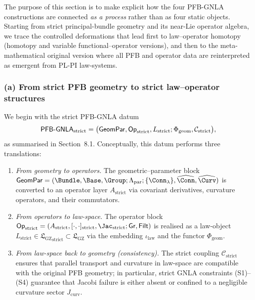 \documentclass[11pt]{book}
\theoremstyle{plain}
\theoremstyle{definition}
\newcommand{\GZLS}{\ensuremath{\mathfrak{L}_{\mathrm{GZ}}}}       \newcommand{\GZLT}{\ensuremath{M_{!w}}}                           \newcommand{\GZLOC}{\ensuremath{A_M}}                             \newcommand{\GZLCurv}{\ensuremath{\mathcal{F}_{\mathrm{law}}}}
\begin{document}
The purpose of this section is to make explicit how the four PFB-GNLA
constructions are connected \emph{as a process} rather than as four
static objects. Starting from strict principal-bundle geometry and its
near-Lie operator algebra, we trace the controlled deformations that
lead first to law--operator homotopy (homotopy and variable
functional--operator versions), and then to the meta-mathematical
original version where all PFB and operator data are reinterpreted as
emergent from PL-PI law-systems.



\subsubsection*{(a) From strict PFB geometry to strict law--operator structures}

We begin with the strict PFB-GNLA datum
\[
  \mathsf{PFB\text- GNLA}_{\mathrm{strict}}
  =
  \bigl(
    \mathsf{GeomPar},
    \mathsf{Op}_{\mathrm{strict}},
    L_{\mathrm{strict}};
    \Phi_{\mathrm{geom}},
    \mathcal{C}_{\mathrm{strict}}
  \bigr),
\]
as summarised in Section~8.1. Conceptually, this datum performs three
translations:

\begin{enumerate}[label=\roman*)]
  \item \emph{From geometry to operators.}
        The geometric--parameter block \\
        $\mathsf{GeomPar}=(\Bundle,\Base,\Group;
           \Lambda_{\mathrm{par}};\{\Conn_\lambda\},
           \widehat{\Conn},\widehat{\Curv})$
        is converted to an operator layer
        $A_{\mathrm{strict}}$ via covariant derivatives, curvature
        operators, and their commutators.
  \item \emph{From operators to law-space.}
        The operator block \\
        $\mathsf{Op}_{\mathrm{strict}}=
          (A_{\mathrm{strict}},
           [\cdot,\cdot]_{\mathrm{strict}},
           \Jac_{\mathrm{strict}};\mathsf{Gr},\mathsf{Filt})$
        is realised as a law-object \\
        $L_{\mathrm{strict}}\in{\GZLS}_{\mathrm{strict}}\subset\GZLS$
        via the embedding $\iota_{\mathrm{law}}$ and the functor
        $\Phi_{\mathrm{geom}}$.
  \item \emph{From law-space back to geometry (consistency).}
        The strict coupling $\mathcal{C}_{\mathrm{strict}}$ ensures
        that parallel transport and curvature in law-space are
        compatible with the original PFB geometry; in particular,
        strict GNLA constraints (S1)--(S4) guarantee that Jacobi
        failure is either absent or confined to a negligible curvature
        sector $J_{\mathrm{curv}}$.
\end{enumerate}
\end{document}
